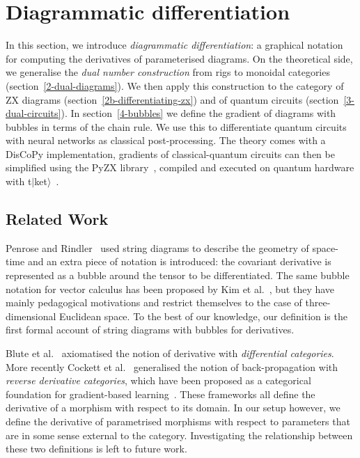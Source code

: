 
\section{Diagrammatic differentiation}\label{section:diag-diff}

In this section, we introduce \emph{diagrammatic differentiation}: a graphical notation for computing the derivatives of parameterised diagrams.
On the theoretical side, we generalise the \emph{dual number construction} from rigs to monoidal categories (section~\ref{2-dual-diagrams}).
We then apply this construction to the category of ZX diagrams (section~\ref{2b-differentiating-zx}) and of quantum circuits (section~\ref{3-dual-circuits}).
In section~\ref{4-bubbles} we define the gradient of diagrams with bubbles in terms of the chain rule.
We use this to differentiate quantum circuits with neural networks as classical post-processing.
The theory comes with a DisCoPy implementation, gradients of classical-quantum circuits can then
be simplified using the PyZX library~\cite{KissingerVanDeWetering19}, compiled and executed
on quantum hardware with t$\vert$ket$\rangle$~\cite{SivarajahEtAl20}.

\subsection*{Related Work}

Penrose and Rindler~\cite{PenroseRindler84} used string diagrams to describe the geometry of space-time and an extra piece of notation is introduced: the covariant derivative is represented as a bubble around the tensor to be differentiated.
The same bubble notation for vector calculus has been proposed by Kim et al.~\cite{KimEtAl20}, but they have mainly pedagogical motivations and restrict themselves to the case of three-dimensional Euclidean space.
To the best of our knowledge, our definition is the first formal account of string diagrams with bubbles for derivatives.

Blute et al.~\cite{BluteEtAl06} axiomatised the notion of derivative with \emph{differential categories}.
More recently Cockett et al.~\cite{CockettEtAl19} generalised the notion of back-propagation with \emph{reverse derivative categories}, which have been proposed as a categorical foundation for gradient-based learning~\cite{CruttwellEtAl21}.
These frameworks all define the derivative of a morphism with respect to its domain.
In our setup however, we define the derivative of parametrised morphisms with respect to parameters that are in some sense external to the category.
Investigating the relationship between these two definitions is left to future work.


